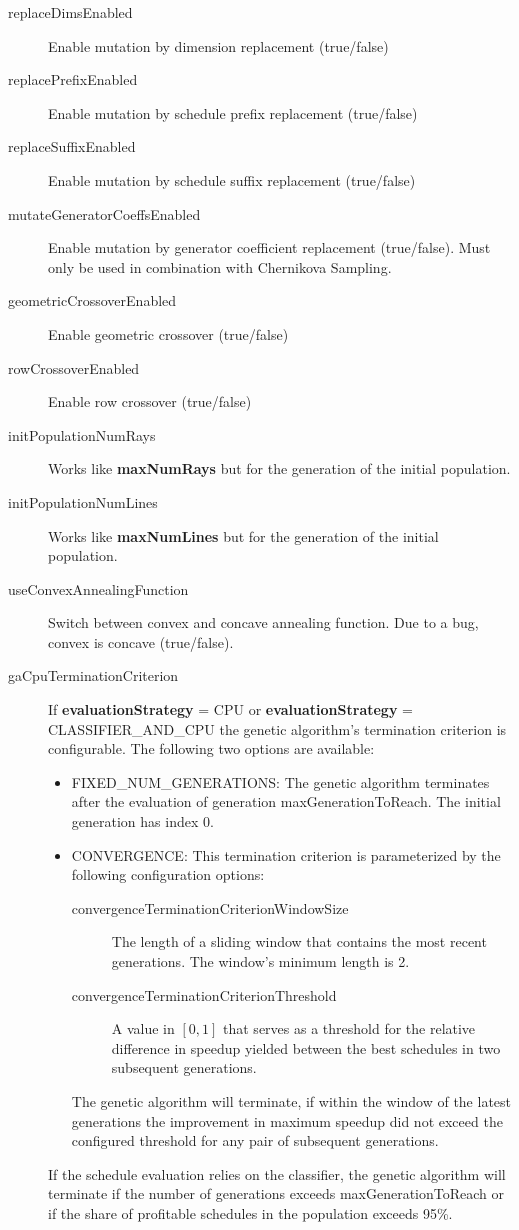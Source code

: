 \documentclass{article}
\begin{document}
\begin{description}
  \item[replaceDimsEnabled] Enable mutation by dimension replacement
    (true/false)
  \item[replacePrefixEnabled] Enable mutation by schedule prefix
    replacement (true/false)
  \item[replaceSuffixEnabled] Enable mutation by schedule suffix
    replacement (true/false)
  \item[mutateGeneratorCoeffsEnabled] Enable mutation by generator
    coefficient replacement (true/false). Must only be used in combination
    with Chernikova Sampling.
  \item[geometricCrossoverEnabled] Enable geometric crossover
    (true/false)
  \item[rowCrossoverEnabled] Enable row crossover (true/false)
  \item[initPopulationNumRays] Works like \textbf{maxNumRays} but for
    the generation of the initial population.
  \item[initPopulationNumLines] Works like \textbf{maxNumLines} but
    for the generation of the initial population.
  \item[useConvexAnnealingFunction] Switch between convex and concave
    annealing function. Due to a bug, convex is concave (true/false).
  \item[gaCpuTerminationCriterion] If \textbf{evaluationStrategy} = CPU or
  \textbf{evaluationStrategy} = CLASSIFIER\_AND\_CPU the genetic algorithm's
  termination criterion is configurable. The following two options are
  available:
  \begin{itemize}
    \item FIXED\_NUM\_GENERATIONS: The genetic algorithm terminates after
      the evaluation of generation \textsf{maxGenerationToReach}. The initial
      generation has index 0.
    \item CONVERGENCE: This termination criterion is parameterized by the
      following configuration options:
      \begin{description}
        \item[convergenceTerminationCriterionWindowSize] The length of a sliding
          window that contains the most recent generations. The window's minimum
          length is 2.
        \item[convergenceTerminationCriterionThreshold] A value in $[0, 1]$
          that serves as a threshold for the relative difference in speedup
          yielded between the best schedules in two subsequent generations.
      \end{description}
        The genetic algorithm will terminate, if within the window of the latest
        generations the improvement in maximum speedup did not exceed the
        configured threshold for any pair of subsequent generations.
  \end{itemize}
  If the schedule evaluation relies on the classifier, the genetic algorithm
  will terminate if the number of generations exceeds
  \textsf{maxGenerationToReach} or if the share of profitable schedules in the
  population exceeds 95\%.
\end{description}
\end{document}
